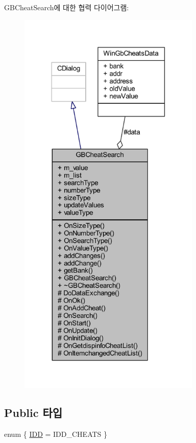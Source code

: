 G\+B\+Cheat\+Search에 대한 협력 다이어그램\+:\nopagebreak
\begin{figure}[H]
\begin{center}
\leavevmode
\includegraphics[width=246pt]{class_g_b_cheat_search__coll__graph}
\end{center}
\end{figure}
\subsection*{Public 타입}
\begin{DoxyCompactItemize}
\item 
enum \{ \mbox{\hyperlink{class_g_b_cheat_search_a8a05654b6ab7a791118b280a11c2bee4a11fb6d777c08226582f9295e72a094c0}{I\+DD}} = I\+D\+D\+\_\+\+C\+H\+E\+A\+TS
 \}
\end{DoxyCompactItemize}
